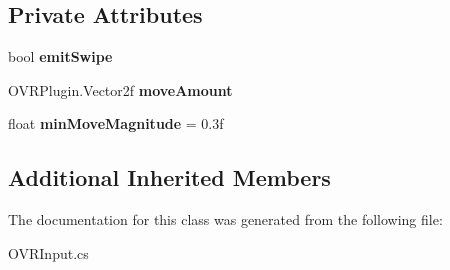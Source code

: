\subsection*{Private Attributes}
\begin{DoxyCompactItemize}
\item 
\mbox{\label{class_o_v_r_input_1_1_o_v_r_controller_l_tracked_remote_ae11b86e0b04566a1247669d69511a47e}} 
bool {\bfseries emit\+Swipe}
\item 
\mbox{\label{class_o_v_r_input_1_1_o_v_r_controller_l_tracked_remote_a765c15ff5eac12c3b7cdfd667379ca42}} 
O\+V\+R\+Plugin.\+Vector2f {\bfseries move\+Amount}
\item 
\mbox{\label{class_o_v_r_input_1_1_o_v_r_controller_l_tracked_remote_ab92ece4feb68bf33ef3f86ff5fb5862b}} 
float {\bfseries min\+Move\+Magnitude} = 0.\+3f
\end{DoxyCompactItemize}
\subsection*{Additional Inherited Members}


The documentation for this class was generated from the following file\+:\begin{DoxyCompactItemize}
\item 
O\+V\+R\+Input.\+cs\end{DoxyCompactItemize}

